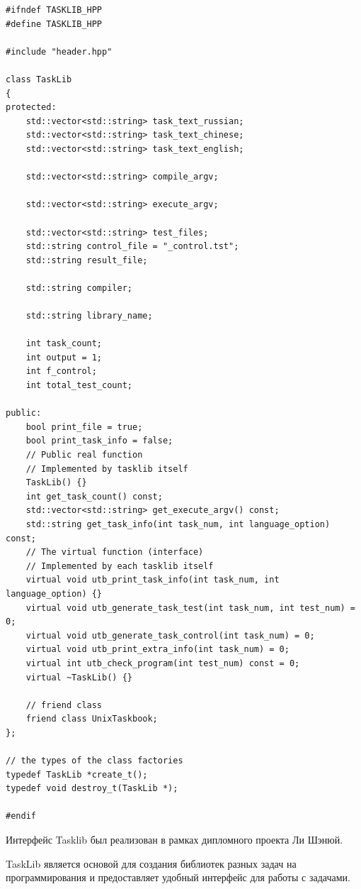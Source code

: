 \lstset{language=c++}
\begin{lstlisting}
#ifndef TASKLIB_HPP
#define TASKLIB_HPP

#include "header.hpp"

class TaskLib
{
protected:
	std::vector<std::string> task_text_russian;
	std::vector<std::string> task_text_chinese;
	std::vector<std::string> task_text_english;

	std::vector<std::string> compile_argv;

	std::vector<std::string> execute_argv;

	std::vector<std::string> test_files;
	std::string control_file = "_control.tst";
	std::string result_file;

	std::string compiler;

	std::string library_name;

	int task_count;
	int output = 1;
	int f_control;
	int total_test_count;

public:
	bool print_file = true;		  
	bool print_task_info = false; 
	// Public real function
	// Implemented by tasklib itself
	TaskLib() {}
	int get_task_count() const;
	std::vector<std::string> get_execute_argv() const;
	std::string get_task_info(int task_num, int language_option) const;
	// The virtual function (interface)
	// Implemented by each tasklib itself
	virtual void utb_print_task_info(int task_num, int language_option) {} 
	virtual void utb_generate_task_test(int task_num, int test_num) = 0;   
	virtual void utb_generate_task_control(int task_num) = 0;
	virtual void utb_print_extra_info(int task_num) = 0;
	virtual int utb_check_program(int test_num) const = 0;
	virtual ~TaskLib() {}

	// friend class
	friend class UnixTaskbook;
};

// the types of the class factories
typedef TaskLib *create_t();
typedef void destroy_t(TaskLib *);

#endif
\end{lstlisting}

Интерфейс Tasklib был реализован в рамках дипломного проекта\cite{ref1} Ли Шэнюй.

TaskLib является основой для создания библиотек разных задач на программирования и предоставляет удобный интерфейс для работы с задачами.


